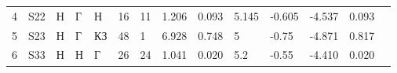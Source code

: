 \begin{tabular}{|l|l|l|l|l|l|l|l|l|l|l|l|l|l}
	4                                        & S22                                            & Н      & Г       & Н      & 16                                              & 11                                              & 1.206                                   & 0.093                                     & 5.145                                           & -0.605                                           & -4.537                                            & 0.093                                          &  \\ \cline{1-13}
	5                                        & S23                                            & Н      & Г       & КЗ     & 48                                              & 1                                               & 6.928                                   & 0.748                                     & 5                                               & -0.75                                            & -4.871                                            & 0.817                                          &  \\ \cline{1-13}
	6                                        & S33                                            & Н      & Н       & Г      & 26                                              & 24                                              & 1.041                                   & 0.020                                     & 5.2                                             & -0.55                                            & -4.410                                            & 0.020                                          &  \\ \cline{1-13}
	\end{tabular}
